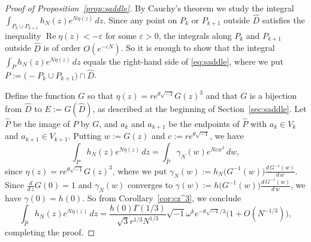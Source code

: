 \documentclass[a4paper,dvipdfmx]{amsart}
\theoremstyle{plain}
\theoremstyle{definition}
\theoremstyle{remark}
\renewcommand{\Re}{\operatorname{Re}}
\renewcommand{\i}{\sqrt{-1}}
\numberwithin{equation}{section}
\begin{document}
\begin{proof}[Proof of Proposition~\ref{prop:saddle}]
By Cauchy's theorem we study the integral $\int_{P_{k}\cup P_{k+1}}h_N(z)e^{N\eta(z)}\,dz$.
Since any point on $P_{k}$ or $P_{k+1}$ outside $\hat{D}$ satisfies the inequality $\Re\eta(z)<-\varepsilon$ for some $\varepsilon>0$, the integrals along $P_{k}$ and $P_{k+1}$ outside $\hat{D}$ is of order $O(e^{-\varepsilon N})$.
So it is enough to show that the integral $\int_{P}h_N(z)e^{N\eta(z)}\,dz$ equals the right-hand side of \eqref{eq:saddle}, where we put $P:=\bigl(-P_{k}\cup P_{k+1}\bigr)\cap\hat{D}$.
\par
Define the function $G$ so that $\eta(z)=re^{\theta\i}G(z)^3$ and that $G$ is a bijection from $\hat{D}$ to $E:=G(\hat{D})$, as described at the beginning of Section~\ref{sec:saddle}.
Let $\hat{P}$ be the image of $P$ by $G$, and $a_{k}$ and $a_{k+1}$ be the endpoints of $\hat{P}$ with $a_{k}\in V_{k}$ and $a_{k+1}\in V_{k+1}$.
Putting $w:=G(z)$ and $c:=re^{\theta\i}$, we have
\begin{equation*}
  \int_{P}h_{N}(z)e^{N\eta(z)}\,dz
  =
  \int_{\hat{P}}\gamma_N(w)e^{Ncw^3}\,dw,
\end{equation*}
since $\eta(z)=re^{\theta\i}G(z)^3$, where we put $\gamma_N(w):=h_N\bigl(G^{-1}(w)\bigr)\frac{d\,G^{-1}(w)}{d\,w}$.
Since $\frac{d}{d\,z}G(0)=1$ and $\gamma_N(w)$ converges to $\gamma(w):=h\bigl(G^{-1}(w)\bigr)\frac{d\,G^{-1}(w)}{d\,w}$, we have $\gamma(0)=h(0)$.
So from Corollary~\ref{cor:cz^3}, we conclude
\begin{equation*}
  \int_{\hat{P}}h_N(z)e^{N\eta(z)}\,dz
  =
  \frac{h(0)\Gamma(1/3)}{\sqrt{3}r^{1/3}N^{1/3}}\i\omega^{k}e^{-\theta\i/3}
  \bigl(1+O(N^{-1/3})\bigr),
\end{equation*}
completing the proof.
\end{proof}
\end{document}

